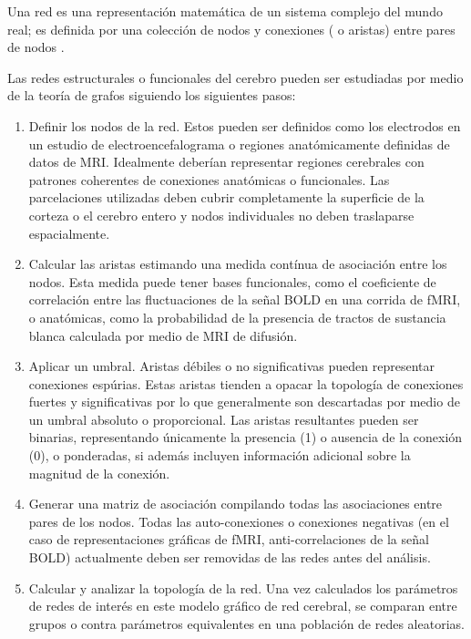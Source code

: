 Una red es una representación matemática de un sistema complejo del mundo real; es definida por una colección de nodos y conexiones ( o aristas) entre pares de nodos \parencite{Bullmore2009a,Rubinov2010}. \par
Las redes estructurales o funcionales del cerebro pueden ser estudiadas por medio de la teoría de grafos siguiendo los siguientes pasos:
\begin{enumerate}
    \item Definir los nodos de la red.
        Estos pueden ser definidos como los electrodos en un estudio de electroencefalograma o regiones anatómicamente definidas de datos de MRI.
        Idealmente deberían representar regiones cerebrales con patrones coherentes de conexiones anatómicas o funcionales.
        Las parcelaciones utilizadas deben cubrir completamente la superficie de la corteza o el cerebro entero y nodos individuales no deben traslaparse espacialmente.
    \item Calcular las aristas estimando una medida contínua de asociación entre los nodos.
        Esta medida puede tener bases funcionales, como el coeficiente de correlación entre las fluctuaciones de la señal BOLD en una corrida de fMRI, o anatómicas, como la probabilidad de la presencia de tractos de sustancia blanca calculada por medio de MRI de difusión.
    \item Aplicar un umbral.
        Aristas débiles o no significativas pueden representar conexiones espúrias.
        Estas aristas tienden a opacar la topología de conexiones fuertes y significativas por lo que generalmente son descartadas por medio de un umbral absoluto o proporcional.
        Las aristas resultantes pueden ser binarias, representando únicamente la presencia (1) o ausencia de la conexión (0), o ponderadas, si además incluyen información adicional sobre la magnitud de la conexión.
    \item Generar una matriz de asociación compilando todas las asociaciones entre pares de los nodos.
        Todas las auto-conexiones o conexiones negativas (en el caso de representaciones gráficas de fMRI, anti-correlaciones de la señal BOLD) actualmente deben ser removidas de las redes antes del análisis\parencite{Rubinov2010}.
    \item Calcular y analizar la topología de la red.
        Una vez calculados los parámetros de redes de interés en este modelo gráfico de red cerebral, se comparan entre grupos o contra parámetros equivalentes en una población de redes aleatorias.
\end{enumerate}

